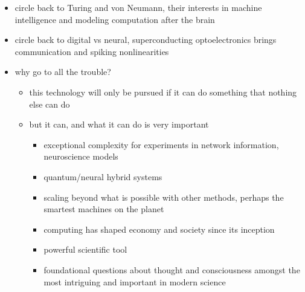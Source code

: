 \documentclass[twocolumn]{article}
\begin{document}
\begin{itemize}

\item circle back to Turing and von Neumann, their interests in machine intelligence and modeling computation after the brain
\item circle back to digital vs neural, superconducting optoelectronics brings communication and spiking nonlinearities

\item why go to all the trouble?
\begin{itemize}
\item this technology will only be pursued if it can do something that nothing else can do
\item but it can, and what it can do is very important
\begin{itemize}
\item exceptional complexity for experiments in network information, neuroscience models
\item quantum/neural hybrid systems
\item scaling beyond what is possible with other methods, perhaps the smartest machines on the planet
\item computing has shaped economy and society since its inception
\item powerful scientific tool
\item foundational questions about thought and consciousness amongst the most intriguing and important in modern science
\end{itemize}

\end{itemize}

\end{itemize}


\end{document}
